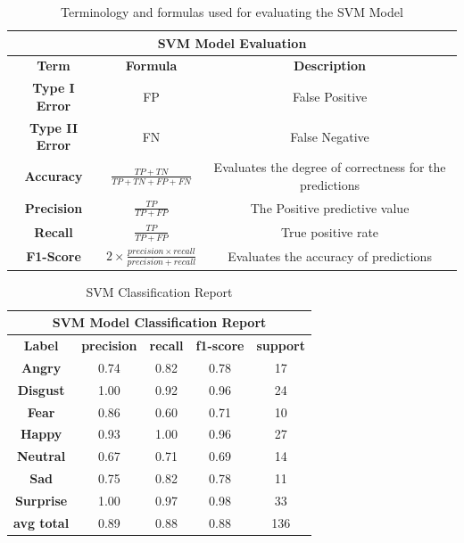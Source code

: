 \begin{itemize}
\begin{table}[H]
\centering
\begin{tabular}{ |c||c|c|}
	\hline
	\multicolumn{3}{|c|}{\textbf{SVM Model Evaluation}}\\
	\hline
      	\textbf{Term} &  \textbf{Formula} & \textbf{Description}\\
	\hline
      	\textbf{Type I Error} &      FP  &    False Positive   \\
	\hline
   	\textbf{Type II Error} &     FN  &    False Negative \\
	\hline
       	\textbf{Accuracy} &  $\frac{TP+TN}{TP+TN+FP+FN}$ & Evaluates the degree of correctness for the predictions   \\
	\hline
      	\textbf{Precision} &  $\frac{TP}{TP+FP}$ 	 &   The Positive predictive value \\
	\hline
    	\textbf{Recall} &     $\frac{TP}{TP+FP}$	 &   True positive rate  \\
	\hline
        \textbf{F1-Score} &  $2\times\frac{precision \times recall}{precision+recall}$  &   Evaluates the accuracy of predictions \\
	\hline
\end{tabular}   
\caption{Terminology and formulas used for evaluating the SVM Model\cite{dict}}
\label{table: terms}
\end{table}

\begin{table}[H]
\centering
\begin{tabular}{ |c||c|c|c|c|}
	\hline
	\multicolumn{5}{|c|}{\textbf{SVM Model Classification Report}}\\
	\hline
      	\textbf{Label} &      \textbf{precision} &   \textbf{recall} & \textbf{f1-score} &  \textbf{support}\\
	\hline
      	\textbf{Angry} &      0.74  &    0.82  &    0.78  &      17\\
   	\textbf{Disgust} &      1.00  &    0.92  &    0.96  &      24\\
       	\textbf{Fear} &      0.86  &    0.60  &    0.71  &      10\\
      	\textbf{Happy} &      0.93  &    1.00  &    0.96  &      27\\
    	\textbf{Neutral} &      0.67  &    0.71  &    0.69  &      14\\
        \textbf{Sad} &      0.75  &    0.82  &    0.78  &      11 \\
   	\textbf{Surprise} &      1.00  &    0.97  &    0.98  &      33 \\
	\hline
	\textbf{avg \/ total}  &     0.89 &     0.88  &   0.88    &   136\\
	\hline
\end{tabular}   
\caption{SVM Classification Report}
\label{table:class}
\end{table}
 
\end{itemize}

